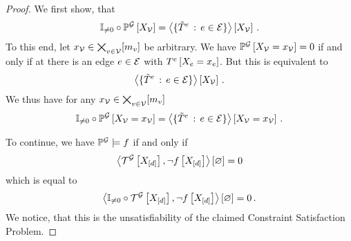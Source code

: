 \begin{proof}
    We first show, that
    \begin{align*}
        \nonzerocirc\probofat{\graph}{\nodevariables} =
        \contractionof{\{\sechypercoreof{\edge} \, : \, \edge\in\edges \}}{\nodevariables} \, . %
    \end{align*}
    To this end, let $x_{\mathcal{V}}\in\bigtimes_{v\in\mathcal{V}}[m_{v}]$ be arbitrary.
    We have $\mathbb{P}^{\mathcal{G}}\left[X_{\mathcal{V}}=x_{\mathcal{V}}\right]=0$ if and only if at there is an edge $e\in\mathcal{E}$ with $T^{e}\left[X_{e}=x_{e}\right]$.
    But this is equivalent to
    \begin{align*}
        \left\langle \{\tilde{T}^{e} \, : \, e\in\mathcal{E} \}\right\rangle \left[ X_{\mathcal{V}} \right] \, .
    \end{align*}
    We thus have for any $x_{\mathcal{V}}\in\bigtimes_{v\in\mathcal{V}}[m_{v}]$
    \begin{align*}
        \nonzerocirc\probofat{\graph}{\indexednodevariables} =
        \contractionof{\{\sechypercoreof{\edge} \, : \, \edge\in\edges \}}{\indexednodevariables} \, . %
    \end{align*}

    To continue, we have $\mathbb{P}^{\mathcal{G}}\models f$ if and only if
    \begin{align*}
        \left\langle \mathcal{T}^{\mathcal{G}}\left[X_{[d]}\right],\lnot f\left[X_{[d]}\right]\right\rangle \left[ \varnothing \right] = 0
    \end{align*}
    which is equal to
    \begin{align*}
        \left\langle \mathbb{I}_{\neq0}\circ\mathcal{T}^{\mathcal{G}}\left[X_{[d]}\right],\lnot f\left[X_{[d]}\right]\right\rangle \left[ \varnothing \right] = 0 \, .
    \end{align*}
    We notice, that this is the unsatisfiability of the claimed Constraint Satisfaction Problem.

\end{proof}

